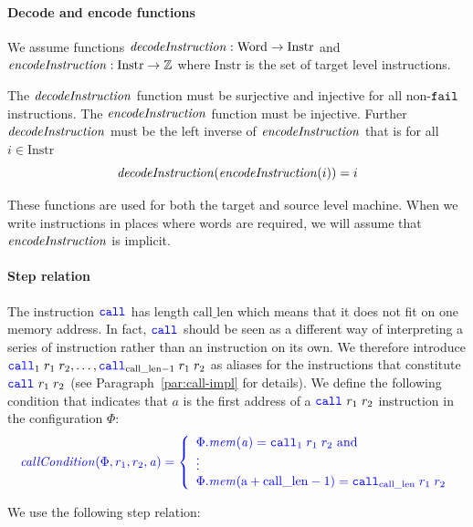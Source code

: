 \documentclass[a3paper]{article}
\newcommand{\fun}{\rightarrow}
\newcommand{\tand}{\text{ and }}
\newcommand{\sourcecolor}{\color{blue}}
\newcommand{\src}[1]{{\sourcecolor #1}}
\newcommand{\targetcolor}[1]{\color{black}}
\newcommand{\trg}[1]{{\targetcolor{} #1}}
\newcommand{\zinstr}[1]{\texttt{#1}}
\newcommand{\scall}[3][]{  
\ifthenelse{\equal{#2#3}{}}
  {\ensuremath{\zinstr{\src{call}}_{#1}}}
  {\ensuremath{\zinstr{\src{call}}_{#1} \; #2 \; #3}}
}
\newcommand{\tfail}{\zinstr{\trg{fail}}}
\newcommand{\ints}{\mathbb{Z}}
\newcommand{\shareddom}[1]{\mathrm{#1}}
\newcommand{\Word}{\shareddom{Word}}
\newcommand{\Instr}{\shareddom{Instr}}
\newcommand{\addr}{\shareddom{a}}
\newcommand{\var}[1]{\mathit{#1}}
\newcommand{\mem}{\var{mem}}
\newcommand{\aaddr}{\var{a}}
\newcommand{\constant}[1]{\mathrm{#1}}
\newcommand{\calllen}{\constant{call\_len}}
\newcommand{\plainfun}[2]{
  \ifthenelse{\equal{#2}{}}
  {\mathit{#1}}
  {\mathit{#1}(#2)}
}
\newcommand{\callCond}[1]{\plainfun{callCondition}{#1}}
\newcommand{\decInstr}[1]{\plainfun{decodeInstruction}{#1}}
\newcommand{\encInstr}[1]{\plainfun{encodeInstruction}{#1}}
\begin{document}
\paragraph{Decode and encode functions}
We assume functions $\decInstr{} : \Word \fun \Instr$ and $\encInstr{} : \Instr \fun \ints$ where $\Instr$ is the set of target level instructions.

The $\decInstr{}$ function must be surjective and injective for all non-$\tfail$ instructions. The $\encInstr{}$ function must be injective. Further $\decInstr{}$ must be the left inverse of $\encInstr{}$ that is for all $i \in \Instr$
\[
  \decInstr{}(\encInstr{i}) = i
\]

These functions are used for both the target and source level machine. When we write instructions in places where words are required, we will assume that $\encInstr{}$ is implicit.

\paragraph{Step relation}
The instruction $\scall{}{}$ has length $\calllen$ which means that it does not fit on one memory address. In fact, $\scall{}{}$ should be seen as a different way of interpreting a series of instruction rather than an instruction on its own. We therefore introduce $\scall[1]{r_1}{r_2},\dots,\scall[\calllen-1]{r_1}{r_2}$ as aliases for the instructions that constitute $\scall{r_1}{r_2}$ (see Paragraph~\ref{par:call-impl} for details). We define the following condition that indicates that $\aaddr$ is the first address of a $\scall{r_1}{r_2}$ instruction in the configuration $\Phi$:
\[
  \sourcecolor\left.
    \callCond{\Phi,r_1,r_2,\aaddr} = \left\{
      \begin{array}{l}
        \Phi.\mem(\aaddr) = \scall[1]{r_1}{r_2} \tand\\
        \vdots \\
        \Phi.\mem(\addr+\calllen-1) = \scall[\calllen]{r_1}{r_2}
      \end{array}
      \right.
  \right.
\]

We use the following step relation:
\end{document}
